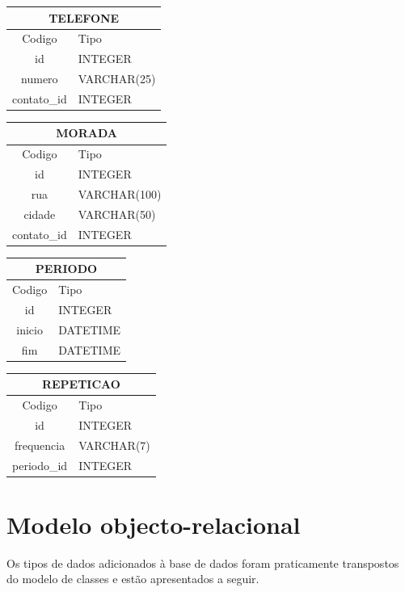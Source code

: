\documentclass[a4paper,12pt]{article}
\begin{document}
\begin{multicols}{2}
		\begin{tabular}{|c|l|} \hline
			\multicolumn{2}{|c|}{TELEFONE} \\ \hline
			Codigo & Tipo \\ \hline
			id & INTEGER \\
			numero & VARCHAR(25) \\
			contato\_id & INTEGER \\ \hline
		\end{tabular}
		
		\begin{tabular}{|c|l|} \hline
			\multicolumn{2}{|c|}{MORADA} \\ \hline
			Codigo & Tipo \\ \hline
			id & INTEGER \\
			rua & VARCHAR(100) \\
			cidade & VARCHAR(50) \\
			contato\_id & INTEGER \\ \hline
		\end{tabular}

		\begin{tabular}{|c|l|} \hline
			\multicolumn{2}{|c|}{PERIODO} \\ \hline
			Codigo & Tipo \\ \hline
			id & INTEGER \\
			inicio & DATETIME \\
			fim & DATETIME \\ \hline
		\end{tabular}
		
		\begin{tabular}{|c|l|} \hline
			\multicolumn{2}{|c|}{REPETICAO} \\ \hline
			Codigo & Tipo \\ \hline
			id & INTEGER \\
			frequencia & VARCHAR(7) \\
			periodo\_id & INTEGER \\ \hline
		\end{tabular}

	\end{multicols}

\section{Modelo objecto-relacional}

	Os tipos de dados adicionados à base de dados foram praticamente transpostos do modelo de classes e estão apresentados a seguir. 
	
\end{document}
